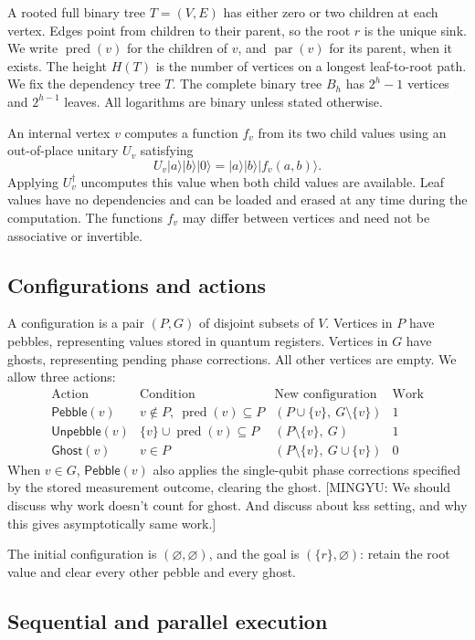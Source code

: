 \documentclass[11pt]{article}
\theoremstyle{definition}
\theoremstyle{remark}
\DeclareMathOperator{\pred}{pred}
\DeclareMathOperator{\parv}{par}
\newcommand{\Peb}{\mathsf{Pebble}}
\newcommand{\ket}[1]{\lvert#1\rangle}
\newcommand{\Unp}{\mathsf{Unpebble}}
\newcommand{\Ghost}{\mathsf{Ghost}}
\newcommand{\mingyu}[1]{{\color{magenta}\footnotesize [MINGYU: #1]}} %
\begin{document}
A rooted full binary tree $T=(V,E)$ has either zero or two children at each vertex. Edges point from children to their parent, so the root $r$ is the unique sink. We write $\pred(v)$ for the children of $v$, and $\parv(v)$ for its parent, when it exists. The height $H(T)$ is the number of vertices on a longest leaf-to-root path. We fix the dependency tree $T$. The complete binary tree $B_h$ has
$2^h-1$ vertices and $2^{h-1}$ leaves.
All logarithms are binary unless stated otherwise.

An internal vertex $v$ computes a function $f_v$ from its two child values using an out-of-place unitary $U_v$ satisfying
\[
U_v\ket{a}\ket{b}\ket{0}=\ket{a}\ket{b}\ket{f_v(a,b)}.
\]
Applying $U_v^\dagger$ uncomputes this value when both child values are available. Leaf values have no dependencies and can be loaded and erased at any time during the computation. The functions $f_v$ may differ between vertices and need not be associative or invertible.

\subsection{Configurations and actions}

A configuration is a pair $(P,G)$ of disjoint subsets of $V$. Vertices in $P$ have pebbles, representing values stored in quantum registers. Vertices in $G$ have ghosts, representing pending phase corrections. All other vertices are empty. We allow three actions:
\[
\begin{array}{lllc}
\text{Action} & \text{Condition} & \text{New configuration} & \text{Work} \\[3pt]
\Peb(v) & v\notin P,\ \pred(v)\subseteq P & (P\cup\{v\},\ G\setminus\{v\}) & 1 \\[3pt]
\Unp(v) & \{v\}\cup\pred(v)\subseteq P & (P\setminus\{v\},\ G) & 1 \\[3pt]
\Ghost(v) & v\in P & (P\setminus\{v\},\ G\cup\{v\}) & 0
\end{array}
\]
When $v\in G$, $\Peb(v)$ also applies the single-qubit phase corrections specified by the stored measurement outcome, clearing the ghost. \mingyu{We should discuss why work doesn't count for ghost. And discuss about kss setting, and why this gives asymptotically same work.}

The initial configuration is $(\varnothing,\varnothing)$, and the goal is $(\{r\},\varnothing)$: retain the root value and clear every other pebble and every ghost.

\subsection{Sequential and parallel execution}
\end{document}
